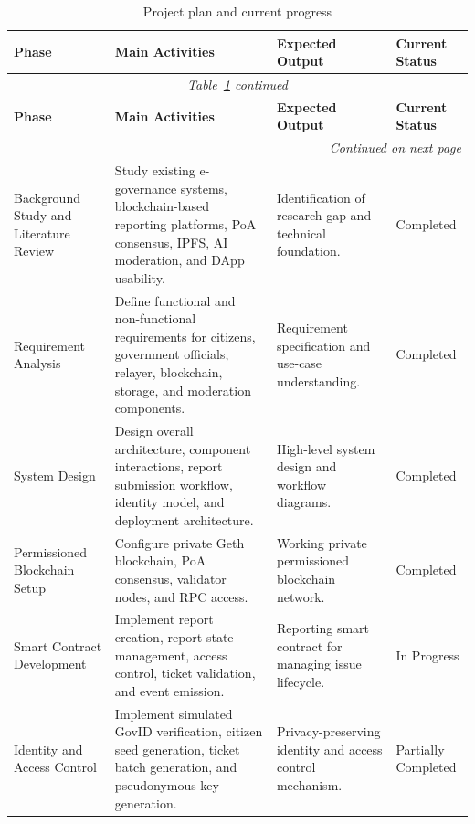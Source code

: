 \begin{longtable}{|p{3.2cm}|p{5.2cm}|p{4.2cm}|p{2.2cm}|}
\caption{Project plan and current progress}
\label{tab:project_plan} \\
\hline
\textbf{Phase} & \textbf{Main Activities} & \textbf{Expected Output} & \textbf{Current Status} \\
\hline
\endfirsthead

\multicolumn{4}{c}{\textit{Table~\ref{tab:project_plan} continued}} \\
\hline
\textbf{Phase} & \textbf{Main Activities} & \textbf{Expected Output} & \textbf{Current Status} \\
\hline
\endhead

\hline
\multicolumn{4}{r}{\textit{Continued on next page}} \\
\endfoot

\hline
\endlastfoot

Background Study and Literature Review
& Study existing e-governance systems, blockchain-based reporting platforms, PoA consensus, IPFS, AI moderation, and DApp usability.
& Identification of research gap and technical foundation.
& Completed \\
\hline

Requirement Analysis
& Define functional and non-functional requirements for citizens, government officials, relayer, blockchain, storage, and moderation components.
& Requirement specification and use-case understanding.
& Completed \\
\hline

System Design
& Design overall architecture, component interactions, report submission workflow, identity model, and deployment architecture.
& High-level system design and workflow diagrams.
& Completed \\
\hline

Permissioned Blockchain Setup
& Configure private Geth blockchain, PoA consensus, validator nodes, and RPC access.
& Working private permissioned blockchain network.
& Completed \\
\hline

Smart Contract Development
& Implement report creation, report state management, access control, ticket validation, and event emission.
& Reporting smart contract for managing issue lifecycle.
& In Progress \\
\hline

Identity and Access Control
& Implement simulated GovID verification, citizen seed generation, ticket batch generation, and pseudonymous key generation.
& Privacy-preserving identity and access control mechanism.
& Partially Completed \\
\hline


\end{longtable}
